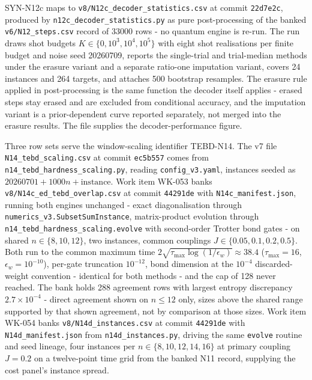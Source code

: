 SYN-N12c maps to \texttt{v8/N12c\_decoder\_statistics.csv} at commit \texttt{22d7e2c}, produced by \texttt{n12c\_decoder\_statistics.py} as pure post-processing of the banked \texttt{v6/N12\_steps.csv} record of 33000 rows - no quantum engine is re-run. The run draws shot budgets $K \in \{0, 10^{3}, 10^{4}, 10^{5}\}$ with eight shot realisations per finite budget and noise seed 20260709, reports the single-trial and trial-median methods under the erasure variant and a separate ratio-one imputation variant, covers 24 instances and 264 targets, and attaches 500 bootstrap resamples. The erasure rule applied in post-processing is the same function the decoder itself applies - erased steps stay erased and are excluded from conditional accuracy, and the imputation variant is a prior-dependent curve reported separately, not merged into the erasure results. The file supplies the decoder-performance figure.

Three row sets serve the window-scaling identifier TEBD-N14. The v7 file \texttt{N14\_tebd\_scaling.csv} at commit \texttt{ec5b557} comes from \texttt{n14\_tebd\_hardness\_scaling.py}, reading \texttt{config\_v3.yaml}, instances seeded as $20260701 + 1000n + \mathrm{instance}$. Work item WK-053 banks \texttt{v8/N14c\_ed\_tebd\_overlap.csv} at commit \texttt{44291de} with \texttt{N14c\_manifest.json}, running both engines unchanged - exact diagonalisation through \texttt{numerics\_v3.SubsetSumInstance}, matrix-product evolution \cite{schollwock2011density} through \texttt{n14\_tebd\_hardness\_scaling.evolve} with second-order Trotter bond gates - on shared $n \in \{8, 10, 12\}$, two instances, common couplings $J \in \{0.05, 0.1, 0.2, 0.5\}$. Both run to the common maximum time $2\sqrt{\tau_{\max}\log(1/\epsilon_{w})} \approx 38.4$ ($\tau_{\max} = 16$, $\epsilon_{w} = 10^{-10}$), per-gate truncation $10^{-12}$, bond dimension at the $10^{-4}$ discarded-weight convention - identical for both methods - and the cap of 128 never reached. The bank holds 288 agreement rows with largest entropy discrepancy $2.7 \times 10^{-4}$ - direct agreement shown on $n \le 12$ only, sizes above the shared range supported by that shown agreement, not by comparison at those sizes. Work item WK-054 banks \texttt{v8/N14d\_instances.csv} at commit \texttt{44291de} with \texttt{N14d\_manifest.json} from \texttt{n14d\_instances.py}, driving the same \texttt{evolve} routine and seed lineage, four instances per $n \in \{8, 10, 12, 14, 16\}$ at primary coupling $J = 0.2$ on a twelve-point time grid from the banked N11 record, supplying the cost panel's instance spread.

